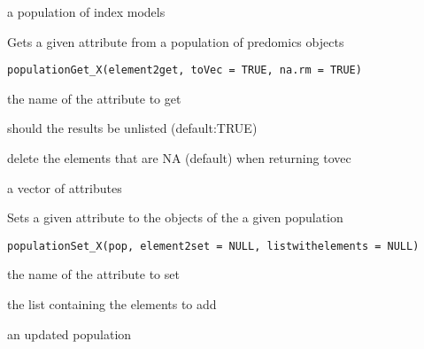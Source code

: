 \documentclass[a4paper]{book}
\begin{document}
%
\begin{Value}
a population of index models
\end{Value}
%
\begin{Description}
Gets a given attribute from a population of predomics objects
\end{Description}
%
\begin{Usage}
\begin{verbatim}
populationGet_X(element2get, toVec = TRUE, na.rm = TRUE)
\end{verbatim}
\end{Usage}
%
\begin{Arguments}
\begin{ldescription}
\item[\code{element2get:}] the name of the attribute to get

\item[\code{toVec:}] should the results be unlisted (default:TRUE)

\item[\code{na.rm:}] delete the elements that are NA (default) when returning tovec
\end{ldescription}
\end{Arguments}
%
\begin{Value}
a vector of attributes
\end{Value}
%
\begin{Description}
Sets a given attribute to the objects of the a given population
\end{Description}
%
\begin{Usage}
\begin{verbatim}
populationSet_X(pop, element2set = NULL, listwithelements = NULL)
\end{verbatim}
\end{Usage}
%
\begin{Arguments}
\begin{ldescription}
\item[\code{element2set:}] the name of the attribute to set

\item[\code{listwithelements:}] the list containing the elements to add
\end{ldescription}
\end{Arguments}
%
\begin{Value}
an updated population
\end{Value}
\end{document}
